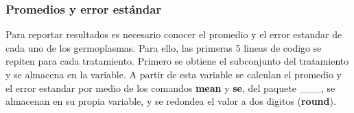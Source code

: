 \documentclass[]{article}
\begin{document}
\hypertarget{promedios-y-error-estandar}{%
\subsubsection{Promedios y error
estándar}\label{promedios-y-error-estandar}}

Para reportar resultados es necesario conocer el promedio y el error
estandar de cada uno de los germoplasmas. Para ello, las primeras 5
lineas de codigo se repiten para cada tratamiento. Primero se obtiene el
subconjunto del tratamiento y se almacena en la variable. A partir de
esta variable se calculan el promedio y el error estandar por medio de
los comandos \textbf{mean} y \textbf{se}, del paquete \_\_\_, se
almacenan en su propia variable, y se redondea el valor a dos digitos
(\textbf{round}).
\end{document}
